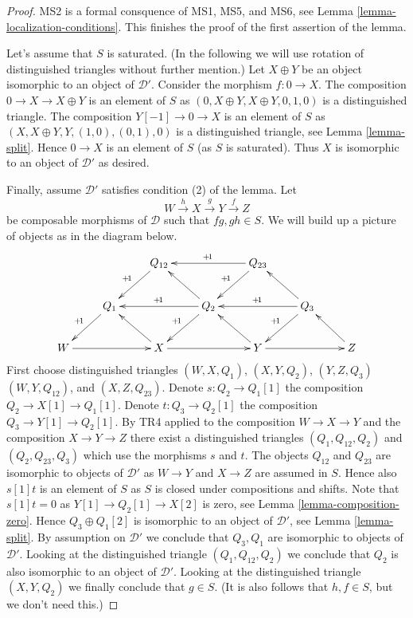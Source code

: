 \begin{proof}
\medskip\noindent
MS2 is a formal consquence of MS1, MS5, and MS6, see
Lemma \ref{lemma-localization-conditions}.
This finishes the proof of the first assertion of the lemma.

\medskip\noindent
Let's assume that $S$ is saturated. (In the following we will use
rotation of distinguished triangles without further mention.)
Let $X \oplus Y$ be an object isomorphic to an object of $\mathcal{D}'$.
Consider the morphism $f : 0 \to X$. The composition
$0 \to X \to X \oplus Y$ is an element
of $S$ as $(0, X \oplus Y, X \oplus Y, 0, 1, 0)$ is a distinguished
triangle. The composition $Y[-1] \to 0 \to X$ is an element of $S$
as $(X, X \oplus Y, Y, (1, 0), (0, 1), 0)$ is a distinguished triangle, see
Lemma \ref{lemma-split}.
Hence $0 \to X$ is an element of $S$ (as $S$ is saturated).
Thus $X$ is isomorphic to an object of $\mathcal{D}'$ as desired.

\medskip\noindent
Finally, assume $\mathcal{D}'$ satisfies condition (2) of the lemma.
Let
$$
W \xrightarrow{h}
X \xrightarrow{g}
Y \xrightarrow{f} Z
$$
be composable morphisms of $\mathcal{D}$ such that $fg, gh \in S$.
We will build up a picture of objects as in the diagram below.
$$
\xymatrix{
 & &
Q_{12} \ar[ld]_{\!+\!1} & &
Q_{23} \ar[ld]_{\!+\!1} \ar[ll]_{\!+\!1} \\
 &
Q_1 \ar[ld]_{\!+\!1} & &
Q_2 \ar[ld]_{\!+\!1} \ar[ll]_{\!+\!1} \ar[lu] & &
Q_3 \ar[ld]_{\!+\!1} \ar[ll]_{\!+\!1} \ar[lu] \\
W \ar[rr] & &
X \ar[lu] \ar[rr] & &
Y \ar[lu] \ar[rr] & &
Z \ar[lu]
}
$$
First choose distinguished triangles
$(W, X, Q_1)$, $(X, Y, Q_2)$, $(Y, Z, Q_3)$ $(W, Y, Q_{12})$, and
$(X, Z, Q_{23})$. Denote $s : Q_2 \to Q_1[1]$ the composition
$Q_2 \to X[1] \to Q_1[1]$. Denote $t : Q_3 \to Q_2[1]$ the
composition $Q_3 \to Y[1] \to Q_2[1]$.
By TR4 applied to the composition $W \to X \to Y$
and the composition $X \to Y \to Z$ there exist
a distinguished triangles $(Q_1, Q_{12}, Q_2)$ and $(Q_2, Q_{23}, Q_3)$
which use the morphisms $s$ and $t$.
The objects $Q_{12}$ and $Q_{23}$ are isomorphic to objects of
$\mathcal{D}'$ as $W \to Y$ and $X \to Z$ are assumed in $S$.
Hence also $s[1]t$ is an element of $S$ as $S$ is closed under compositions
and shifts.
Note that $s[1]t = 0$ as $Y[1] \to Q_2[1] \to X[2]$ is zero, see
Lemma \ref{lemma-composition-zero}.
Hence $Q_3 \oplus Q_1[2]$ is isomorphic to an object of $\mathcal{D}'$, see
Lemma \ref{lemma-split}.
By assumption on $\mathcal{D}'$ we conclude that $Q_3, Q_1$ are isomorphic
to objects of $\mathcal{D}'$. Looking at the distinguished triangle
$(Q_1, Q_{12}, Q_2)$ we conclude that $Q_2$ is also isomorphic to
an object of $\mathcal{D}'$. Looking at the distinguished triangle
$(X, Y, Q_2)$ we finally conclude that $g \in S$. (It is also
follows that $h, f \in S$, but we don't need this.)
\end{proof}

